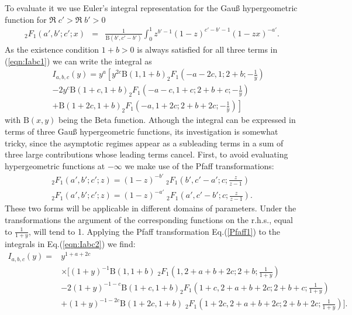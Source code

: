 To evaluate it we use Euler's integral representation for the Gau{\ss} hypergeometric function for $\Re \; c' > \Re \; b' > 0$
\begin{eqnarray}
_{2}F_{1}(a',b';c';x) &=& \frac{1}{\mathrm{B}(b',c'-b')}    \int_{0}^{1} z^{b'-1} (1-z)^{c'-b'-1} (1-zx)^{-a'} \label{IntegralRep}. 
\end{eqnarray}
As the existence condition $1+b>0$ is always satisfied for all three terms in (\ref{eqn:Iabc1}) we can write the integral as
\begin{eqnarray}
&& I_{a,b,c}(y) = \label{eqn:Iabc2}  y^a  \left[  y^{2c} \mathrm{B}(1,1+b) _2F_1 \left(-a-2c,1;2+b; -\frac{1}{y} \right) \right.  \\
&& -2 y^{c} \mathrm{B}(1+c, 1+b) _2F_1 \left(-a-c,1+c;2+b+c; -\frac{1}{y} \right) \nonumber \\ 
&& \left. + \mathrm{B}(1+2c , 1+b) _2F_1 \left(-a,1+2c;2+b+2c; -\frac{1}{y} \right) \right]  \nonumber 
\end{eqnarray}
with $\mathrm{B}(x,y)$ being the Beta function. 
Athough the integral can be expressed in terms of three Gau{\ss} hypergeometric functions,
its investigation is somewhat tricky, since the asymptotic regimes appear as a subleading terms 
in a sum of three large contributions whose leading terms cancel. First, to avoid evaluating hypergeometric functions at $-\infty$ 
we make use of the Pfaff transformations:
\begin{align}
_2F_1(a',b';c';z) = (1-z)^{-b'} \; _2F_1 \left( b',c'-a';c;\frac{z}{z-1} \right) \label{Pfaff1} \\
_2F_1(a',b';c';z) = (1-z)^{-a'} \; _2F_1 \left( a',c'-b';c;\frac{z}{z-1} \right). \label{Pfaff2}
\end{align}
These two forms will be applicable in different domains of parameters. Under the transformations the argument of the corresponding functions on the r.h.s., equal to $\frac{1}{1+y}$, will tend to 1. Applying the Pfaff transformation Eq.(\ref{Pfaff1}) to the integrals in Eq.(\ref{eqn:Iabc2}) we find:
%
\begin{align*}
 I_{a,b,c}(y) =& y^{1+a+2c} \\
 & \times \bigg[  (1+y)^{-1} \mathrm{B}(1,1+b)  \;  _2F_1 \left(1,2+a+b+2c;2+b; \frac{1}{1+y} \right)  \\ 
&  -2 (1+y)^{-1-c} \mathrm{B}(1+c, 1+b)   _2F_1 \left(1+c,2+a+b+2c;2+b+c; \frac{1}{1+y} \right) \\ 
&  + (1+y)^{-1-2c} \mathrm{B}(1+2c , 1+b)  \;  _2F_1 \left(1+2c,2+a+b+2c;2+b+2c;\frac{1}{1+y} \right) \bigg].
\end{align*} 
